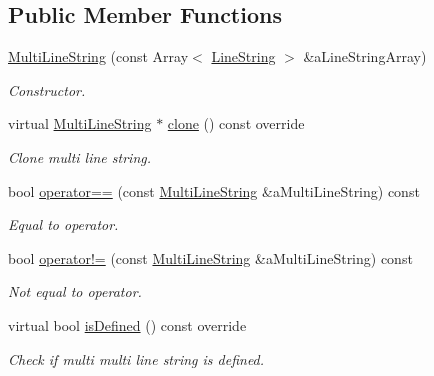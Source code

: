 \subsection*{Public Member Functions}
\begin{DoxyCompactItemize}
\item 
\hyperlink{classlibrary_1_1math_1_1geom_1_1d2_1_1objects_1_1_multi_line_string_a8fd6c575f0489484f99c94c607631303}{Multi\+Line\+String} (const Array$<$ \hyperlink{classlibrary_1_1math_1_1geom_1_1d2_1_1objects_1_1_line_string}{Line\+String} $>$ \&a\+Line\+String\+Array)
\begin{DoxyCompactList}\small\item\em Constructor. \end{DoxyCompactList}\item 
virtual \hyperlink{classlibrary_1_1math_1_1geom_1_1d2_1_1objects_1_1_multi_line_string}{Multi\+Line\+String} $\ast$ \hyperlink{classlibrary_1_1math_1_1geom_1_1d2_1_1objects_1_1_multi_line_string_a38054f0f0a2c198b5d3c76ef22562e30}{clone} () const override
\begin{DoxyCompactList}\small\item\em Clone multi line string. \end{DoxyCompactList}\item 
bool \hyperlink{classlibrary_1_1math_1_1geom_1_1d2_1_1objects_1_1_multi_line_string_abc2730ad53ff446aa68f60b28bbfd396}{operator==} (const \hyperlink{classlibrary_1_1math_1_1geom_1_1d2_1_1objects_1_1_multi_line_string}{Multi\+Line\+String} \&a\+Multi\+Line\+String) const
\begin{DoxyCompactList}\small\item\em Equal to operator. \end{DoxyCompactList}\item 
bool \hyperlink{classlibrary_1_1math_1_1geom_1_1d2_1_1objects_1_1_multi_line_string_aa3bde774845839971ad6fd89200fdb76}{operator!=} (const \hyperlink{classlibrary_1_1math_1_1geom_1_1d2_1_1objects_1_1_multi_line_string}{Multi\+Line\+String} \&a\+Multi\+Line\+String) const
\begin{DoxyCompactList}\small\item\em Not equal to operator. \end{DoxyCompactList}\item 
virtual bool \hyperlink{classlibrary_1_1math_1_1geom_1_1d2_1_1objects_1_1_multi_line_string_a77de687b2c287226984e2614dafe744a}{is\+Defined} () const override
\begin{DoxyCompactList}\small\item\em Check if multi multi line string is defined. \end{DoxyCompactList}\item 

\end{DoxyCompactItemize}
